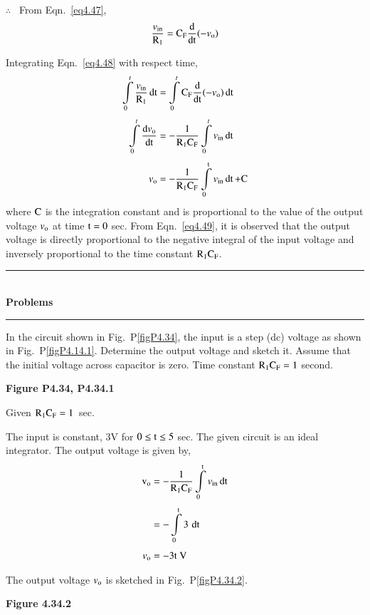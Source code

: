 $\therefore$~ From Eqn.~\eqref{eq4.47},
\begin{equation}
\frac{v_{\text{in}}}{\textrm{R}_{1}}=\textrm{C}_{\textrm{F}}\frac{\textrm{d}}{\operatorname{dt}}(-v_{\textrm{o}})\label{eq4.48}
\end{equation}

Integrating Eqn.~\eqref{eq4.48} with respect time,
\begin{align}
\int\limits^{t}_{0}\frac{v_{\text{in}}}{\textrm{R}_{1}}\operatorname{dt} &= \int\limits^{t}_{0}\textrm{C}_{\textrm{F}}\dfrac{\textrm{d}}{\operatorname{dt}}(-v_{\textrm{o}})\operatorname{dt}\notag\\[3pt]
\int\limits^{t}_{0}\dfrac{\textrm{d} v_{\textrm{o}}}{\operatorname{dt}} &= -\dfrac{1}{\textrm{R}_{1}\textrm{C}_{\textrm{F}}}\int\limits^{t}_{0}v_{\text{in}}\operatorname{dt}\notag\\[3pt]
v_{\textrm{o}} &= -\frac{1}{\textrm{R}_{1}\textrm{C}_{\textrm{F}}}\int\limits^{\textrm{t}}_{0}v_{\text{in}}\operatorname{dt}+\textrm{C}\label{eq4.49}
\end{align}
where $\textrm{C}$ is the integration constant and is proportional to the value of the output voltage $v_{\textrm{o}}$ at time $\textrm{t}=0$ sec. From Eqn.~\eqref{eq4.49}, it is observed that the output voltage is directly proportional to the negative integral of the input voltage and inversely proportional to the time constant $\textrm{R}_{1}\textrm{C}_{\textrm{F}}$.

\begin{center}
\rule{4cm}{1pt}\\
{\bf\Large Problems}\\[-3pt]
\rule{4cm}{1pt}
\end{center}

\begin{problem}\label{prob4.35}
In the circuit shown in Fig.~P\ref{figP4.34}, the input is a step (dc) voltage as shown in Fig.~P\ref{figP4.14.1}. Determine the output voltage and sketch it. Assume that the initial voltage across capacitor is zero. Time constant $\textrm{R}_{1}\textrm{C}_{\textrm{F}}=1$ second.
\begin{center}
{\bf Figure P4.34, P4.34.1}
\end{center}
\end{problem}

\begin{solution}
Given $\textrm{R}_{1}\textrm{C}_{\textrm{F}}=1$~sec.
\smallskip

The input is constant, 3V for $0\leq \textrm{t}\leq 5$ sec. The given circuit is an ideal integrator. The output voltage is given by,
\begin{align*}
\textrm{v}_{\textrm{o}} &= -\frac{1}{\textrm{R}_{1}\textrm{C}_{\textrm{F}}}\int\limits^{\textrm{t}}_{0}v_{\text{in}}\operatorname{dt}\\[3pt]
&= -\int\limits^{\textrm{t}}_{0}3\,\operatorname{dt}\\[3pt]
v_{\textrm{o}} &= -3\textrm{t} \ \textrm{V}
\end{align*}

The output voltage $v_{\textrm{o}}$ is sketched in Fig.~P\ref{figP4.34.2}.
\begin{center}
{\bf Figure 4.34.2}
\end{center}
\end{solution}

